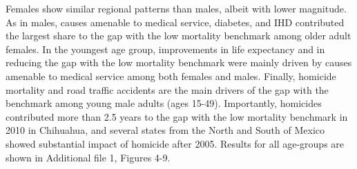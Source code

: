 \documentclass{bmcart}
\begin{document}
Females show similar regional patterns than males, albeit with lower magnitude. As in males, causes amenable to medical service, diabetes, and IHD contributed the largest share to the gap with the low mortality benchmark among older adult females. In the youngest age group, improvements in life expectancy and in reducing the gap with the low mortality benchmark were mainly driven by causes amenable to medical service among both females and males. Finally, homicide mortality and road traffic accidents are the main drivers of the gap with the benchmark among young male adults (ages 15-49). Importantly, homicides contributed more than 2.5 years to the gap with the low mortality benchmark in 2010 in Chihuahua, and several states from the North and South of Mexico showed substantial impact of homicide after 2005. Results for all age-groups are shown in Additional file 1, Figures 4-9.


\end{document}
